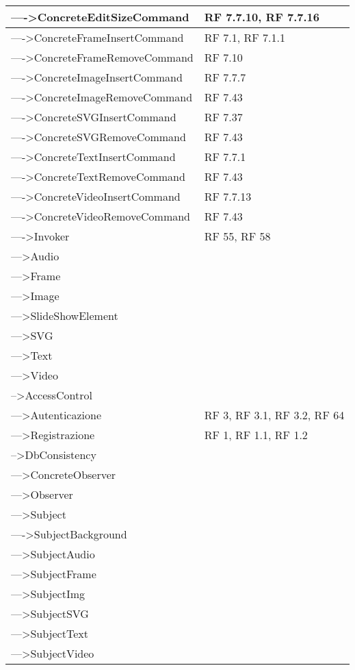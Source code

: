 {\begin{longtable} [c]{| p{8cm} | p{5cm} |}
 \hline 
---->ConcreteEditSizeCommand & RF 7.7.10, RF 7.7.16\\ 
 \hline 
---->ConcreteFrameInsertCommand & RF 7.1, RF 7.1.1\\ 
 \hline 
---->ConcreteFrameRemoveCommand & RF 7.10\\ 
 \hline 
---->ConcreteImageInsertCommand & RF 7.7.7\\ 
 \hline 
---->ConcreteImageRemoveCommand & RF 7.43\\ 
 \hline 
---->ConcreteSVGInsertCommand & RF 7.37\\ 
 \hline 
---->ConcreteSVGRemoveCommand & RF 7.43\\ 
 \hline 
---->ConcreteTextInsertCommand & RF 7.7.1\\ 
 \hline 
---->ConcreteTextRemoveCommand & RF 7.43\\ 
 \hline 
---->ConcreteVideoInsertCommand & RF 7.7.13\\ 
 \hline 
---->ConcreteVideoRemoveCommand & RF 7.43\\ 
 \hline 
---->Invoker & RF 55, RF 58\\ 
 \hline 
--->Audio & \\ 
 \hline 
--->Frame & \\ 
 \hline 
--->Image & \\ 
 \hline 
--->SlideShowElement & \\ 
 \hline 
--->SVG & \\ 
 \hline 
--->Text & \\ 
 \hline 
--->Video & \\ 
 \hline 
-->AccessControl & \\ 
 \hline 
--->Autenticazione & RF 3, RF 3.1, RF 3.2, RF 64\\ 
 \hline 
--->Registrazione & RF 1, RF 1.1, RF 1.2\\ 
 \hline 
-->DbConsistency & \\ 
 \hline 
--->ConcreteObserver & \\ 
 \hline 
--->Observer & \\ 
 \hline 
--->Subject & \\ 
 \hline 
---->SubjectBackground & \\ 
 \hline 
--->SubjectAudio & \\ 
 \hline 
--->SubjectFrame & \\ 
 \hline 
--->SubjectImg & \\ 
 \hline 
--->SubjectSVG & \\ 
 \hline 
--->SubjectText & \\ 
 \hline 
--->SubjectVideo & \\ 

\end{longtable}}
